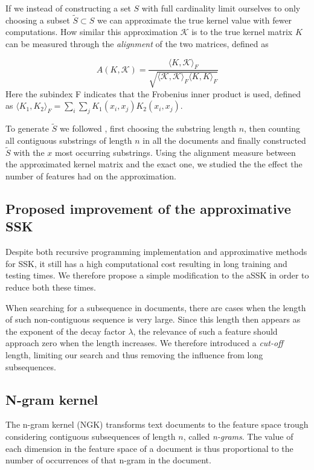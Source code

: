 If we instead of constructing a set $ S $ with full cardinality limit ourselves to only choosing a subset $ \tilde{S} \subset S $ we can approximate the true kernel value with fewer computations. How similar this approximation $ \mathcal{K} $ is to the true kernel matrix $ K $ can be measured through the \textit{alignment} of the two matrices, defined as

\begin{equation}\label{key}
A(K,\mathcal{K}) = \dfrac{\langle K, \mathcal{K}\rangle_{F}}{\sqrt{\langle \mathcal{K}, \mathcal{K}\rangle_{F} \langle K, K\rangle_{F} }}
\end{equation}
Here the subindex F indicates that the Frobenius inner product is used, defined as $ \langle K_1,K_2 \rangle_{F} = \sum_{i}\sum_{j}K_1(x_i,x_j)K_2(x_i,x_j) $.

To generate $ \tilde{S} $ we followed \cite{lodhi}, first choosing the substring length $ n $, then counting all contiguous substrings of length $ n $ in all the documents and finally constructed $ \tilde{S} $ with the $ x $ most occurring substrings. Using the alignment measure between the approximated kernel matrix and the exact one, we studied the the effect the number of features had on the approximation. 

\subsection{Proposed improvement of the approximative SSK}
Despite both recursive programming implementation and approximative methods for SSK, it still has a high computational cost resulting in long training and testing times. We therefore propose a simple modification to the aSSK in order to reduce both these times. 

When searching for a subsequence in documents, there are cases when the length of such non-contiguous sequence is very large. Since this length then appears as the exponent of the decay factor $ \lambda $, the relevance of such a feature should approach zero when the length increases. We therefore introduced a \textit{cut-off} length, limiting our search and thus removing the influence from long subsequences. 


\subsection{N-gram kernel}
The n-gram kernel (NGK) transforms text documents to the feature space trough considering contiguous subsequences of length $ n $, called \textit{n-grams}. The value of each dimension in the feature space of a document is thus proportional to the number of occurrences of that n-gram in the document. 


